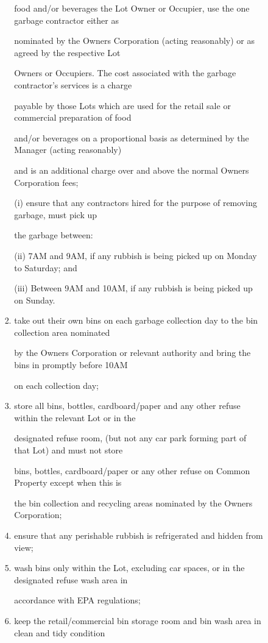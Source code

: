 \documentclass{article}
\begin{document}
\begin{enumerate}[label=\arabic*.]
\begin{enumerate}[label=\arabic{enumi}.\arabic*.]
\begin{enumerate}[label=(\arabic*)]
\begin{enumerate}[label=(\alph*)]
food and/or beverages the Lot Owner or Occupier, use the one garbage contractor either as 

nominated by the Owners Corporation (acting reasonably) or as agreed by the respective Lot 

Owners or Occupiers. The cost associated with the garbage contractor’s services is a charge 

payable by those Lots which are used for the retail sale or commercial preparation of food 

and/or beverages on a proportional basis as determined by the Manager (acting reasonably) 

and is an additional charge over and above the normal Owners Corporation fees; 

(i) ensure that any contractors hired for the purpose of removing garbage, must pick up 

the garbage between: 

(ii) 7AM and 9AM, if any rubbish is being picked up on Monday to Saturday; and 

(iii) Between 9AM and 10AM, if any rubbish is being picked up on Sunday. 

\item  take out their own bins on each garbage collection day to the bin collection area nominated 

by the Owners Corporation or relevant authority and bring the bins in promptly before 10AM 

on each collection day; 

\item  store all bins, bottles, cardboard/paper and any other refuse within the relevant Lot or in the 

designated refuse room, (but not any car park forming part of that Lot) and must not store 

bins, bottles, cardboard/paper or any other refuse on Common Property except when this is 

the bin collection and recycling areas nominated by the Owners Corporation; 

\item  ensure that any perishable rubbish is refrigerated and hidden from view; 

\item  wash bins only within the Lot, excluding car spaces, or in the designated refuse wash area in 

accordance with EPA regulations; 

\item  keep the retail/commercial bin storage room and bin wash area in clean and tidy condition 


\end{enumerate}
\end{enumerate}
\end{enumerate}
\end{enumerate}
\end{document}

